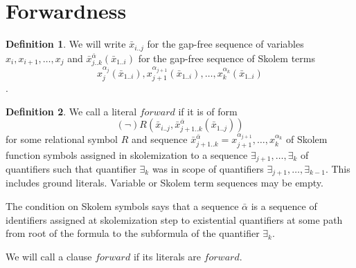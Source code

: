 \documentclass[english, shortabstract]{iithesis}
\theoremstyle{definition} \newtheorem{definition}{Definition}[chapter]
\theoremstyle{remark} \newtheorem{remark}[definition]{Observation}
\theoremstyle{plain} \newtheorem{theorem}[definition]{Theorem}
\theoremstyle{plain} \newtheorem{lemma}[definition]{Lemma}
\begin{document}
\section{Forwardness}

\begin{definition}\label{def:notation}
We will write $\bar{x}_{i..j}$ for the gap-free sequence of variables $x_i, x_{i+1}, \dots, x_j$ and 
$\bar{x}^{\bar{\alpha}}_{j..k}(\bar{x}_{1..i})$ for the gap-free sequence of Skolem terms
$$x^{\alpha_{j}}_{j}(\bar{x}_{1..i}), x^{\alpha_{j+1}}_{j+1}(\bar{x}_{1..i}), \dots, x^{\alpha_k}_k(\bar{x}_{1..i})$$.
\end{definition}

\begin{definition}\label{def:forward}
We call a literal $forward$ if it is of form
$$(\lnot)R(\bar{x}_{i..j}, \bar{x}^{\bar{\alpha}}_{{j+1..k}}(\bar{x}_{1..j}))$$
for some relational symbol $R$
and sequence $\bar{x}^{\bar{\alpha}}_{{j+1..k}}=x^{\alpha_{j+1}}_{j+1}, \dots, x^{\alpha_{k}}_{k}$ of 
Skolem function symbols assigned in skolemization to a sequence $\exists_{j+1}, \dots, \exists_{k}$ of quantifiers 
such that quantifier $\exists_{k}$ was in scope of quantifiers $\exists_{j+1}, \dots, \exists_{k-1}$.
This includes ground literals. Variable or Skolem term sequences may be empty.
\end{definition}

The condition on Skolem symbols says that a sequence $\bar{\alpha}$ is a
sequence of identifiers assigned at skolemization step to existential quantifiers
at some path from root of the formula to the subformula of the quantifier $\exists_k$.

We will call a clause $forward$ if its literals are $forward$.
\end{document}
